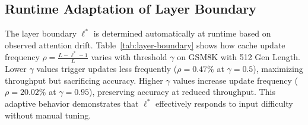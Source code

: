 \documentclass{article} %
\theoremstyle{definition}
\theoremstyle{remark}
\begin{document}
\begin{table}[h]
\centering
\caption{Integration with AdaBlock adaptive window sizing on GSM8K with 512 Gen Length (LLaDA-1.5, $\gamma=0.9$). Format: accuracy / throughput (t/s).}
\label{tab:adablock}
\vspace{-0.1in}
\end{table}

\subsection{Runtime Adaptation of Layer Boundary}

The layer boundary $\ell^*$ is determined automatically at runtime based on observed attention drift. Table~\ref{tab:layer-boundary} shows how cache update frequency $\rho = \frac{L-\ell^*-1}{L}$ varies with threshold $\gamma$ on GSM8K with 512 Gen Length. Lower $\gamma$ values trigger updates less frequently ($\rho=0.47\%$ at $\gamma=0.5$), maximizing throughput but sacrificing accuracy. Higher $\gamma$ values increase update frequency ($\rho=20.02\%$ at $\gamma=0.95$), preserving accuracy at reduced throughput. This adaptive behavior demonstrates that $\ell^*$ effectively responds to input difficulty without manual tuning.

\begin{table}[h]
\centering
\caption{Cache update frequency $\rho$ and performance as layer boundary $\ell^*$ adapts to different thresholds on GSM8K with 512 Gen Length (LLaDA-1.5).}
\label{tab:layer-boundary}
\vspace{-0.1in}
\end{table}
\end{document}
